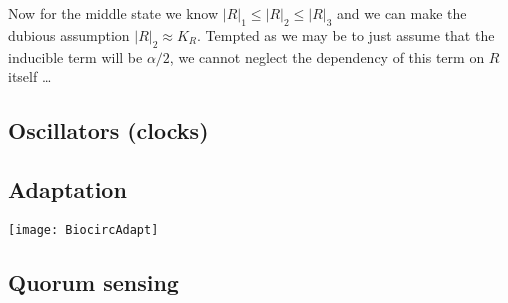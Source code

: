 Now for the middle state we know $|R|_1 \leq |R|_2 \leq |R|_3$ and we can make the dubious assumption $|R|_2 \approx K_R$. Tempted as we may be to just assume that the inducible term will be $\alpha/2$, we cannot neglect the dependency of this term on $R$ itself \dots


\subsection{Oscillators (clocks)}
\subsection{Adaptation}

\begin{marginfigure}
	\begin{center}
		\texttt{[image: BiocircAdapt]}
	\end{center}
	\caption{ ... }
	\label{fig:bcadapt}
\end{marginfigure}

\subsection{Quorum sensing}